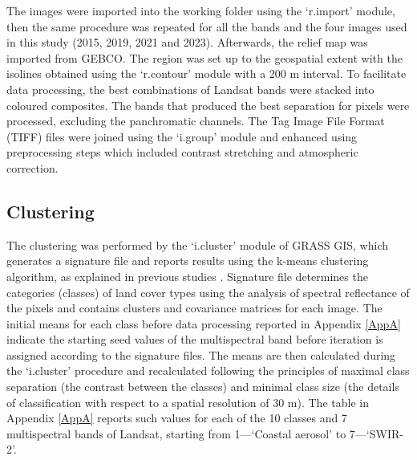 \documentclass[jimaging,article,accept,pdftex,moreauthors]{Definitions/mdpi}
\begin{document}
{The} images were imported into the working folder using the `r.import' module,{ then }the same procedure was repeated for all the bands and the four images used in this study (2015, 2019, 2021 and 2023). Afterwards, the relief map was imported from GEBCO{. }The region was set up to the geospatial extent {with the} isolines{ }obtained{ }using the `r.contour' module{ }with a 200 m interval{.} To facilitate data processing, the best combinations of Landsat bands were{ }stacked into {coloured composites}. The bands that produced the best separation for pixels {were processed, excluding} the panchromatic channels{. The} {Tag Image File Format (TIFF)} files were joined using the `i.group' module {and enhanced using preprocessing steps which included} contrast stretching{ and }atmospheric correction. 

\subsection{Clustering}

The clustering was performed by the `i.cluster' module of GRASS GIS, which generates a signature file and reports results using the k-means clustering algorithm, as explained in previous studies \cite{5930121,10430357,Lemenkova202315,5739741}.{ }{Signature file determines the categories (classes) of land cover types{ using the analysis of spectral reflectance of the pixels} and contains{ }clusters and covariance matrices for each image.} %
{The initial means for each class before data processing reported in Appendix} \ref{AppA} {indicate {the starting seed values} %
of the multispectral band before iteration is assigned according to the signature files. The means are then calculated  during the `i.cluster' procedure and recalculated following the principles of maximal class separation (the contrast between the classes) and minimal class size (the details of classification with respect to a spatial resolution of 30 m). The table in Appendix} \ref{AppA} {reports such values for each of the 10 classes and 7 multispectral bands of Landsat, starting from 1---`Coastal aerosol' to 7---`SWIR-2'.} 
\end{document}
